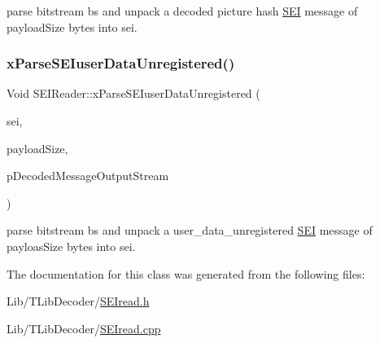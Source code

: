 parse bitstream bs and unpack a decoded picture hash \hyperlink{class_s_e_i}{S\+EI} message of payload\+Size bytes into sei. \mbox{\label{class_s_e_i_reader_a6bfdf54d8881252e817f5c03bcf73fca}} 
\subsubsection{\texorpdfstring{x\+Parse\+S\+E\+Iuser\+Data\+Unregistered()}{xParseSEIuserDataUnregistered()}}
{\footnotesize\ttfamily Void S\+E\+I\+Reader\+::x\+Parse\+S\+E\+Iuser\+Data\+Unregistered (\begin{DoxyParamCaption}\item[{\hyperlink{class_s_e_iuser_data_unregistered}{S\+E\+Iuser\+Data\+Unregistered} \&}]{sei,  }\item[{U\+Int}]{payload\+Size,  }\item[{std\+::ostream $\ast$}]{p\+Decoded\+Message\+Output\+Stream }\end{DoxyParamCaption})\hspace{0.3cm}{\ttfamily [protected]}}

parse bitstream bs and unpack a user\+\_\+data\+\_\+unregistered \hyperlink{class_s_e_i}{S\+EI} message of payloas\+Size bytes into sei. 

The documentation for this class was generated from the following files\+:\begin{DoxyCompactItemize}
\item 
Lib/\+T\+Lib\+Decoder/\hyperlink{_s_e_iread_8h}{S\+E\+Iread.\+h}\item 
Lib/\+T\+Lib\+Decoder/\hyperlink{_s_e_iread_8cpp}{S\+E\+Iread.\+cpp}\end{DoxyCompactItemize}
